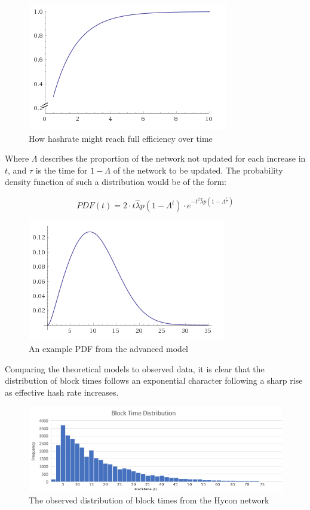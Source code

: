 \documentclass[]{article}
\begin{document}
\begin{figure}[h]
	\centering
	\includegraphics[width=0.7\linewidth]{"./hashpower ramp"}
	\caption{\footnotesize How hashrate might reach full efficiency over time \cite{Wolfram}}
\end{figure}

\pagebreak

Where $\Lambda$ describes the proportion of the network not updated for each increase in $t$, and $\tau$ is the time for $1 - \Lambda$ of the network to be updated. The probability density function of such a distribution would be of the form: 

\begin{equation}
PDF(t) = 2 \cdot t\hat{\lambda}p(1 - \Lambda^t) \cdot e^{-t^2\hat{\lambda}p(1 - \Lambda^\frac{t}{\tau})}
\end{equation}

\begin{figure}[h]
	\centering
	\includegraphics[width=0.7\linewidth]{"./bestpdf"}
	\caption{\footnotesize An example PDF from the advanced model \cite{AdvancedDistribution}}
\end{figure}

Comparing the theoretical models to observed data, it is clear that the distribution of block times follows an exponential character following a sharp rise as effective hash rate increases.

\begin{figure}[h]
	\centering
	\includegraphics[width=0.7\linewidth]{"./blocktime distribution"}
	\caption{\footnotesize The observed distribution of block times from the Hycon network}
\end{figure}
\end{document}
